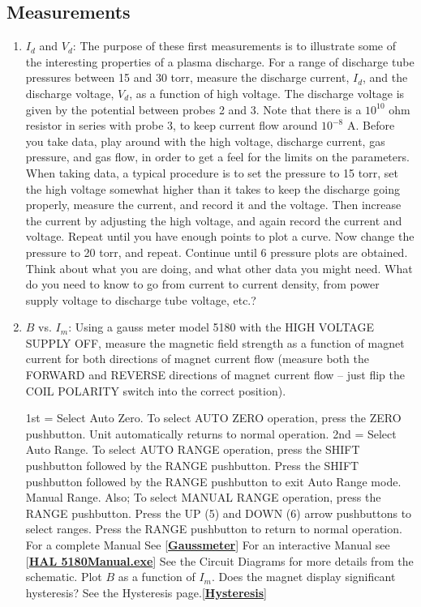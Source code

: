 \documentclass{../lab}
\begin{document}
\subsection{Measurements}

\begin{enumerate}
    \item $I_d$ and $V_d$: The purpose of these first measurements is to illustrate some of the interesting properties of a plasma discharge. For a range of discharge tube pressures between 15 and 30 torr, measure the discharge current, $I_d$, and the discharge voltage, $V_d $, as a function of high voltage. The discharge voltage is given by the potential between probes 2 and 3. Note that there is a $10^{10}$ ohm resistor in series with probe 3, to keep current flow around $10^{-8}$ A. Before you take data, play around with the high voltage, discharge current, gas pressure, and gas flow, in order to get a feel for the limits on the parameters. When taking data, a typical procedure is to set the pressure to 15 torr, set the high voltage somewhat higher than it takes to keep the discharge going properly, measure the current, and record it and the voltage. Then increase the current by adjusting the high voltage, and again record the current and voltage. Repeat until you have enough points to plot a curve. Now change the pressure to 20 torr, and repeat. Continue until  6 pressure plots are obtained. Think about what you are doing, and what other data you might need. What do you need to know to go from current to current density, from power supply voltage to discharge tube voltage, etc.?

    \item $B$ vs. $I_m$: Using a gauss meter model 5180 with the HIGH VOLTAGE SUPPLY OFF, measure the magnetic field strength as a function of magnet current for both directions of magnet current flow (measure both the FORWARD and REVERSE directions of magnet current flow – just flip the COIL POLARITY switch into the correct position).

    1st = Select Auto Zero. To select AUTO ZERO operation, press the ZERO pushbutton. Unit automatically returns to normal operation. 2nd = Select Auto Range. To select AUTO RANGE operation, press the SHIFT pushbutton followed by the RANGE pushbutton. Press the SHIFT pushbutton followed by the RANGE pushbutton to exit Auto Range mode. Manual Range. Also; To select MANUAL RANGE operation, press the RANGE pushbutton. Press the UP (5) and DOWN (6) arrow pushbuttons to select ranges. Press the RANGE pushbutton to return to normal operation. For a complete Manual See [\href{http://physics111.lib.berkeley.edu/Physics111/Equipment\_Manuals/Gaussmeter5180.pdf}{\textbf{Gaussmeter}}] For an interactive Manual see [\href{http://physics111.lib.berkeley.edu/Physics111/Reprints/HAL/5180Manual.exe}{\textbf{HAL 5180Manual.exe}}] See the Circuit Diagrams for more details from the schematic. Plot $B$ as a function of $I_m$. Does the magnet display significant hysteresis? See the Hysteresis page.[\href{http://experimentationlab.berkeley.edu/Hysteresis}{\textbf{Hysteresis}}]


\end{enumerate}
\end{document}

